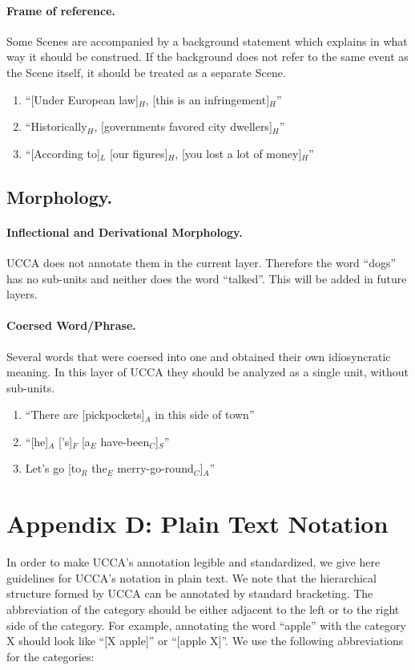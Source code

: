 \documentclass[11pt]{article}
\newcommand{\be}{\begin{enumerate}}
\newcommand{\ee}{\end{enumerate}}
\begin{document}
\paragraph{Frame of reference.} Some Scenes are accompanied by a background statement which explains in what way it should be construed. If the background does not refer to the same event as the Scene itself, it should be treated as a separate Scene.
\be \item
``[Under European law]$_H$, [this is an infringement]$_H$''
\item
``Historically$_H$, [governments favored city dwellers]$_H$''
\item
``[According to]$_L$ [our figures]$_H$, [you lost a lot of money]$_H$''
\ee

\subsection{Morphology.}

\paragraph{Inflectional and Derivational Morphology.} UCCA does not annotate them in the current layer. Therefore the word ``dogs'' has no sub-units and neither does the word ``talked''. This will be added in future layers.

\paragraph{Coersed Word/Phrase.}
Several words that were coersed into one and obtained their own idiosyncratic meaning. In this layer of UCCA they should be analyzed as a single unit, without sub-units.
\be \item
``There are [pickpockets]$_A$ in this side of town''
\item
``[he]$_A$ ['s]$_F$ [a$_E$ have-been$_C$]$_S$''
\item
Let's go [to$_R$ the$_E$ merry-go-round$_C$]$_A$''
\ee

\section{Appendix D: Plain Text Notation}


In order to make UCCA's annotation legible and standardized, we give here guidelines for UCCA's notation in plain text. We note that the hierarchical structure formed by UCCA can be annotated by standard bracketing. The abbreviation of the category should be either adjacent to the left or to the right side of the category.
For example, annotating the word ``apple'' with the category X should look like ``[X apple]'' or ``[apple X]''.
We use the following abbreviations for the categories:\\
\end{document}
